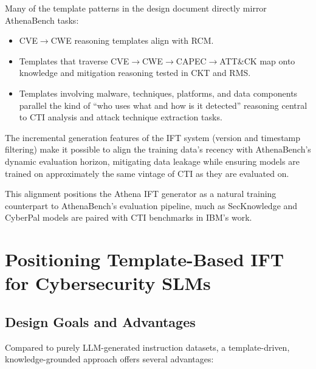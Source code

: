 \documentclass[sigconf]{acmart}
\begin{document}
Many of the template patterns in the design document directly mirror AthenaBench tasks:
\begin{itemize}
  \item CVE$\rightarrow$CWE reasoning templates align with RCM.
  \item Templates that traverse CVE$\rightarrow$CWE$\rightarrow$CAPEC$\rightarrow$ATT\&CK map onto knowledge and mitigation reasoning tested in CKT and RMS.
  \item Templates involving malware, techniques, platforms, and data components parallel the kind of ``who uses what and how is it detected'' reasoning central to CTI analysis and attack technique extraction tasks.\cite{cardei2025ift}
\end{itemize}

The incremental generation features of the IFT system (version and timestamp filtering) make it possible to align the training data's recency with AthenaBench's dynamic evaluation horizon, mitigating data leakage while ensuring models are trained on approximately the same vintage of CTI as they are evaluated on.\cite{cardei2025ift,alam2025athenabench}

This alignment positions the Athena IFT generator as a natural training counterpart to AthenaBench's evaluation pipeline, much as SecKnowledge and CyberPal models are paired with CTI benchmarks in IBM's work.\cite{levi2024cyberpal,levi2025toward}

\section{Positioning Template-Based IFT for Cybersecurity SLMs}
\label{sec:athena-ift}

\subsection{Design Goals and Advantages}

Compared to purely LLM-generated instruction datasets, a template-driven, knowledge-grounded approach offers several advantages:
\end{document}
